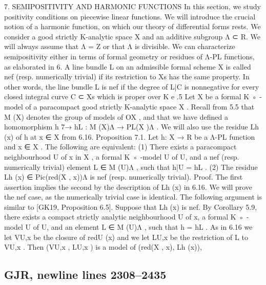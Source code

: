 \documentclass[
  10pt,
]{article}
\newenvironment{Shaded}{}{}
\newcommand{\NormalTok}[1]{#1}
\begin{document}
\begin{Shaded}
\begin{Highlighting}[]
\NormalTok{                          7. SEMIPOSITIVITY AND HARMONIC FUNCTIONS}
\NormalTok{   In this section, we study positivity conditions on piecewise linear functions. We will}
\NormalTok{introduce the crucial notion of a harmonic function, on which our theory of differential}
\NormalTok{forms rests. We consider a good strictly K{-}analytic space X and an additive subgroup}
\NormalTok{Λ ⊂ R. We will always assume that Λ = Z or that Λ is divisible.}
\NormalTok{   We can characterize semipositivity either in terms of formal geometry or residues of}
\NormalTok{Λ{-}PL functions, as elaborated in 6. A line bundle L on an admissible formal scheme X}
\NormalTok{is called nef (resp. numerically trivial) if its restriction to Xs has the same property. In}
\NormalTok{other words, the line bundle L is nef if the degree of L|C is nonnegative for every closed}
\NormalTok{integral curve C ⊂ Xs which is proper over K   e .5}
\NormalTok{   Let X be a formal K ◦ {-}model of a paracompact good strictly K{-}analytic space X . Recall}
\NormalTok{from 5.5 that M (X) denotes the group of models of OX , and that we have defined a}
\NormalTok{homomorphism h 7→ hL : M (X)Λ → PL(X )Λ . We will also use the residue Lh (x) of h at}
\NormalTok{x ∈ X from 6.16.}
\NormalTok{Proposition 7.1. Let h: X → R be a Λ{-}PL function and x ∈ X . The following are equivalent:}
\NormalTok{         (1) There exists a paracompact neighbourhood U of x in X , a formal K ◦ {-}model U of U,}
\NormalTok{             and a nef (resp. numerically trivial) element L ∈ M (U)Λ , such that h|U = hL .}
\NormalTok{         (2) The residue Lh (x) ∈ Pic(red(X , x))Λ is nef (resp. numerically trivial).}
\NormalTok{Proof. The first assertion implies the second by the description of Lh (x) in 6.16. We will}
\NormalTok{prove the nef case, as the numerically trivial case is identical. The following argument}
\NormalTok{is similar to [GK19, Proposition 6.5]. Suppose that Lh (x) is nef. By Corollary 5.9, there}
\NormalTok{exists a compact strictly analytic neighbourhood U of x, a formal K ◦ {-}model U of U, and an}
\NormalTok{element L ∈ M (U)Λ , such that h = hL . As in 6.16 we let VU,x be the closure of redU (x) and}
\NormalTok{we let LU,x be the restriction of L to VU,x . Then (VU,x , LU,x ) is a model of (red(X , x), Lh (x)),}
\end{Highlighting}
\end{Shaded}

\subsection{GJR, newline lines
2308--2435}\label{gjr-newline-lines-23082435}
\end{document}
